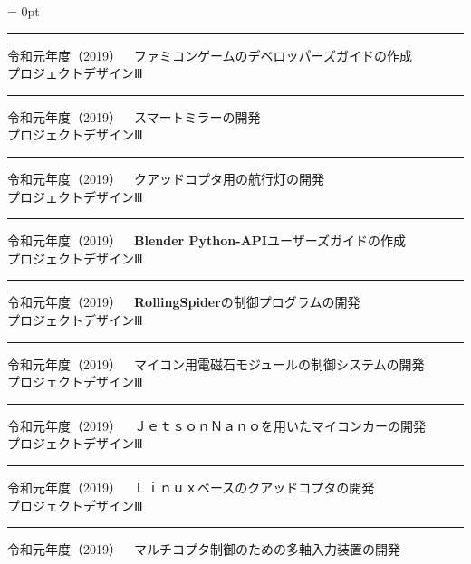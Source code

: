 \documentclass[a4paper,twocolumn]{ltjsarticle}
\begin{document}
\tate

\parindent = 0pt
 \bf 
\hrule\vspace{1mm}
令和元年度（2019）~~ファミコンゲームのデベロッパーズガイドの作成\\   %
プロジェクトデザインⅢ\vspace{1.27mm}
\hrule
\par\vspace{1mm}
令和元年度（2019）~~スマートミラーの開発\\   %
プロジェクトデザインⅢ\vspace{1.27mm}
\hrule
\par\vspace{1mm}
令和元年度（2019）~~クアッドコプタ用の航行灯の開発\\   %
プロジェクトデザインⅢ\vspace{1.27mm}
\hrule
\par\vspace{1mm}
令和元年度（2019）~~{\sf \bfseries Blender Python-API}ユーザーズガイドの作成\\   %
プロジェクトデザインⅢ\vspace{1.27mm}
\hrule
\par\vspace{1mm}
令和元年度（2019）~~{\sf \bfseries RollingSpider}の制御プログラムの開発\\   %
プロジェクトデザインⅢ\vspace{1.27mm}
\hrule
\par\vspace{1mm}
令和元年度（2019）~~マイコン用電磁石モジュールの制御システムの開発\\   %
プロジェクトデザインⅢ\vspace{1.27mm}
\hrule
\par\vspace{1mm}
令和元年度（2019）~~ＪｅｔｓｏｎＮａｎｏを用いたマイコンカーの開発\\   %
プロジェクトデザインⅢ\vspace{1.27mm}
\hrule
\par\vspace{1mm}
令和元年度（2019）~~Ｌｉｎｕｘベースのクアッドコプタの開発\\   %
プロジェクトデザインⅢ\vspace{1.27mm}
\hrule
\par\vspace{1mm}
令和元年度（2019）~~マルチコプタ制御のための多軸入力装置の開発\\   %
\end{document}
